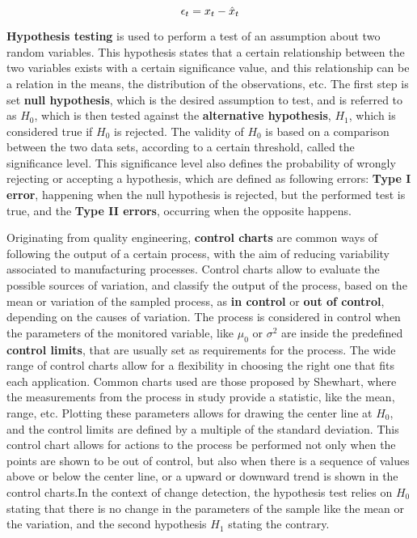 \begin {equation*}
\centering
\epsilon_t = x_t - \hat{x}_t
\end {equation*}

\par \textbf{Hypothesis testing} is used to perform a test of an assumption about two random variables. This hypothesis states that a certain relationship between
the two variables exists with a certain significance value, and this relationship can be a relation in the means, the distribution of the observations, etc. 
The first step is set \textbf{null hypothesis}, which is the desired assumption to test, and is referred to as $H_0$, which is then tested
against the \textbf{alternative hypothesis}, $H_1$, which is considered true if $H_0$ is rejected. The validity of $H_0$ is based on a comparison between the two
data sets, according to a certain threshold, called the significance level. This significance level also defines the probability of wrongly rejecting or accepting a
hypothesis, which are defined as following errors: \textbf{Type I error}, happening when the null hypothesis is rejected, but the performed test is true, and the 
\textbf{Type II errors}, occurring when the opposite happens.

\par Originating from quality engineering, \textbf{control charts} are common ways of following the output of a certain process, with the aim of reducing variability
associated to manufacturing processes. Control charts allow to evaluate the possible sources of variation, and classify the output of the process, based on the mean
or variation of the sampled process, as \textbf{in control} or \textbf{out of control}, depending on the causes of variation. The process is considered in control
when the parameters of the monitored variable, like $\mu_0$ or $\sigma^2$ are inside the predefined \textbf{control limits}, that are usually set as requirements for
the process. The wide range of control charts allow for a flexibility in choosing the right one that fits each application. Common charts used are those proposed by 
Shewhart, where the measurements from the process in study provide a statistic, like the mean, range, etc. Plotting these parameters allows for drawing the center
line at $H_0$, and the control limits are defined by a multiple of the standard deviation. This control chart allows for actions to the process be performed not only
when the points are shown to be out of control, but also when there is a sequence of values above or below the center line, or a upward or downward trend is shown in
the control charts.In the context of change detection, the hypothesis test relies on $H_0$ stating that there is no change in the parameters of the sample like the
mean or the variation, and the second hypothesis $H_1$ stating the contrary.

